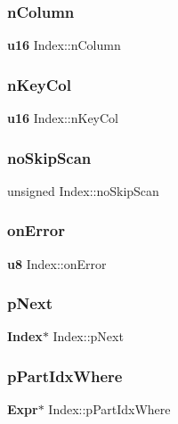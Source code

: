 \mbox{\label{struct_index_ab0e748636131297b5243e61ee9a8042c}} 
\subsubsection{nColumn}
{\footnotesize\ttfamily \textbf{ u16} Index\+::n\+Column}

\mbox{\label{struct_index_acfd52a6b0c7be163dcaf524574f69331}} 
\subsubsection{nKeyCol}
{\footnotesize\ttfamily \textbf{ u16} Index\+::n\+Key\+Col}

\mbox{\label{struct_index_a7704321883c8b38e6dcca88b5886d4ee}} 
\subsubsection{noSkipScan}
{\footnotesize\ttfamily unsigned Index\+::no\+Skip\+Scan}

\mbox{\label{struct_index_ae8bf87d0414e5c46b86192cfbdd271a7}} 
\subsubsection{onError}
{\footnotesize\ttfamily \textbf{ u8} Index\+::on\+Error}

\mbox{\label{struct_index_a115a17d236bd277d59dd5ea030954c3e}} 
\subsubsection{pNext}
{\footnotesize\ttfamily \textbf{ Index}$\ast$ Index\+::p\+Next}

\mbox{\label{struct_index_a92dd15cc702e261dc2face5a27820e07}} 
\subsubsection{pPartIdxWhere}
{\footnotesize\ttfamily \textbf{ Expr}$\ast$ Index\+::p\+Part\+Idx\+Where}

